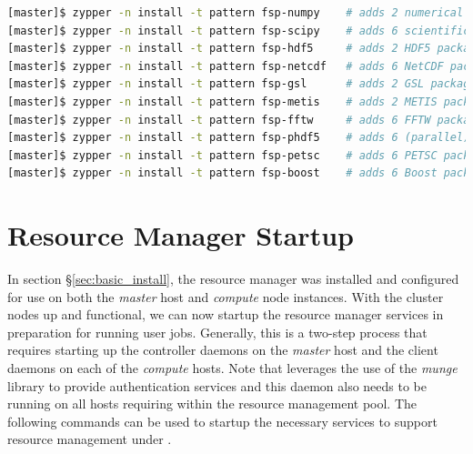 \documentclass[letterpaper]{article}
\begin{document}
\begin{lstlisting}[language=bash,keywords={},upquote=true,keepspaces]
[master]$ zypper -n install -t pattern fsp-numpy    # adds 2 numerical python packages
[master]$ zypper -n install -t pattern fsp-scipy    # adds 6 scientific python packages
[master]$ zypper -n install -t pattern fsp-hdf5     # adds 2 HDF5 packages
[master]$ zypper -n install -t pattern fsp-netcdf   # adds 6 NetCDF packages
[master]$ zypper -n install -t pattern fsp-gsl      # adds 2 GSL packages
[master]$ zypper -n install -t pattern fsp-metis    # adds 2 METIS packages
[master]$ zypper -n install -t pattern fsp-fftw     # adds 6 FFTW packages
[master]$ zypper -n install -t pattern fsp-phdf5    # adds 6 (parallel) HDF5 packages
[master]$ zypper -n install -t pattern fsp-petsc    # adds 6 PETSC packages
[master]$ zypper -n install -t pattern fsp-boost    # adds 6 Boost packages
\end{lstlisting}


\section{Resource Manager Startup}

In section \S\ref{sec:basic_install}, the \SLURM{} resource manager was installed
and configured for use on both the {\em master} host and {\em compute} node
instances. With the cluster nodes up and functional, we can now startup the
resource manager services in preparation for running user jobs. Generally, this
is a two-step process that requires starting up the controller daemons on the {\em
  master} host and the client daemons on each of the {\em compute} hosts.  
Note that \SLURM{} leverages the use of the {\em munge} library to provide
authentication services and this daemon also needs to be running on all hosts
requiring within the resource management pool. 
The following commands can be used to startup the necessary services to support
resource management under \SLURM{}.
\end{document}
